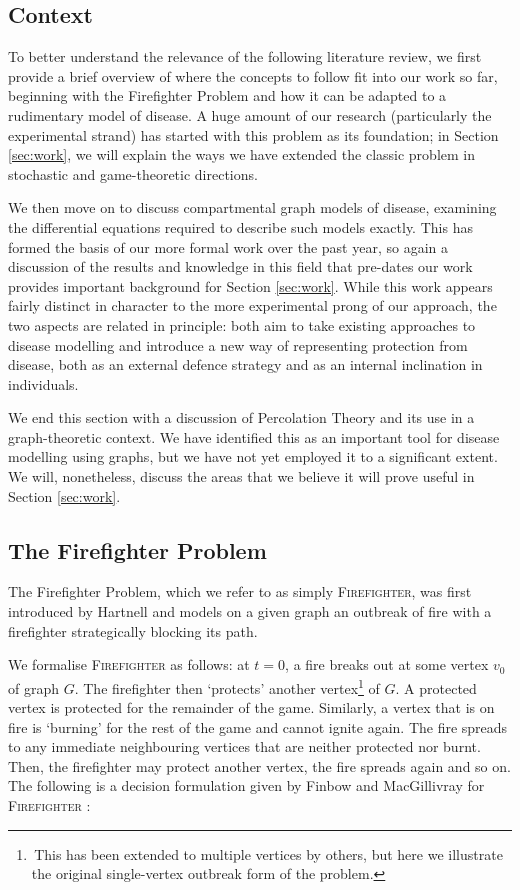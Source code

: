 \documentclass[../report.tex]{subfiles}
\begin{document}
\subsection{Context}

To better understand the relevance of the following literature review, we first provide a brief overview of where the concepts to follow fit into our work so far, beginning with the Firefighter Problem and how it can be adapted to a rudimentary model of disease. A huge amount of our research (particularly the experimental strand) has started with this problem as its foundation; in Section \ref{sec:work}, we will explain the ways we have extended the classic problem in stochastic and game-theoretic directions.

We then move on to discuss compartmental graph models of disease, examining the differential equations required to describe such models exactly. This has formed the basis of our more formal work over the past year, so again a discussion of the results and knowledge in this field that pre-dates our work provides important background for Section \ref{sec:work}. While this work appears fairly distinct in character to the more experimental prong of our approach, the two aspects are related in principle: both aim to take existing approaches to disease modelling and introduce a new way of representing protection from disease, both as an external defence strategy and as an internal inclination in individuals.

We end this section with a discussion of Percolation Theory and its use in a graph-theoretic context. We have identified this as an important tool for disease modelling using graphs, but we have not yet employed it to a significant extent. We will, nonetheless, discuss the areas that we believe it will prove useful in Section \ref{sec:work}.

\subsection{The Firefighter Problem}

The Firefighter Problem, which we refer to as simply {\scshape Firefighter}, was first introduced by Hartnell \cite{hartnell_1995} and models on a given graph an outbreak of fire with a firefighter strategically blocking its path.

We formalise {\scshape Firefighter} as follows: at $t=0$, a fire breaks out at some vertex $v_0$ of graph $G$. The firefighter then `protects' another vertex\footnote{\,This has been extended to multiple vertices by others, but here we illustrate the original single-vertex outbreak form of the problem.} of $G$. A protected vertex is protected for the remainder of the game. Similarly, a vertex that is on fire is `burning' for the rest of the game and cannot ignite again. The fire spreads to any immediate neighbouring vertices that are neither protected nor burnt. Then, the firefighter may protect another vertex, the fire spreads again and so on. The following is a decision formulation given by Finbow and MacGillivray for {\scshape Firefighter} \cite{finbow_2009}:
\vspace{1mm}
\end{document}
